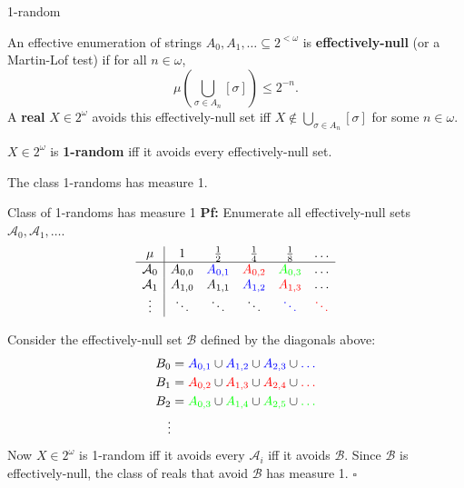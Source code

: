 \begin{frame}{1-random}
  \begin{define*}
    An effective enumeration of strings
    $A_0,A_1,\ldots \subseteq 2^{<\omega}$ is \textbf{effectively-null} (or a
    Martin-Lof test) if for all $n\in\omega$,
    \[\mu\left(\bigcup_{\sigma \in A_n} [\sigma] \right) \leq 2^{-n}.\]
    A \textbf{real} $X\in2^\omega$ avoids this effectively-null set iff
    $X\not\in \bigcup_{\sigma \in A_n} [\sigma]$ for some $n\in\omega$.
  \end{define*}

  \begin{define*}
    $X\in2^\omega$ is \textbf{1-random} iff it avoids every
    effectively-null set.
  \end{define*}

  \begin{thm*}
    The class 1-randoms has measure 1.
  \end{thm*}
\end{frame}

\begin{frame}{Class of 1-randoms has measure 1}
  \textbf{Pf:} Enumerate all effectively-null sets
  $\mathcal{A}_0,\mathcal{A}_1,\ldots$.
  \[\begin{array}{c|ccccc}
    \mu &1 &\frac{1}{2} &\frac{1}{4} &\frac{1}{8} &\ldots\\
    \hline
    \mathcal{A}_0 &A_{0,0} &\textcolor{blue}{A_{0,1}}
    &\textcolor{red}{A_{0,2}} &\textcolor{green}{A_{0,3}} &\ldots\\
    \mathcal{A}_1 &A_{1,0} &A_{1,1} &\textcolor{blue}{A_{1,2}}
    &\textcolor{red}{A_{1,3}} &\ldots\\
    \vdots &\ddots &\ddots &\ddots
    &\textcolor{blue}{\ddots} &\textcolor{red}{\ddots}
  \end{array}\]

  Consider the effectively-null set $\mathcal{B}$ defined by the diagonals
  above:
  \begin{align*}
    B_0&= \textcolor{blue}{A_{0,1}} \cup \textcolor{blue}{A_{1,2}} \cup
    \textcolor{blue}{A_{2,3}} \cup \textcolor{blue}{\ldots}\\
    B_1&= \textcolor{red}{A_{0,2}} \cup \textcolor{red}{A_{1,3}} \cup
    \textcolor{red}{A_{2,4}} \cup \textcolor{red}{\ldots}\\
    B_2&= \textcolor{green}{A_{0,3}} \cup \textcolor{green}{A_{1,4}} \cup
    \textcolor{green}{A_{2,5}} \cup \textcolor{green}{\ldots}\\
    \vdots&
  \end{align*}
  Now $X\in2^\omega$ is 1-random iff it avoids every $\mathcal{A}_i$ iff
  it avoids $\mathcal{B}$. Since $\mathcal{B}$ is effectively-null, the
  class of reals that avoid $\mathcal{B}$ has measure 1. $\square$
\end{frame}


